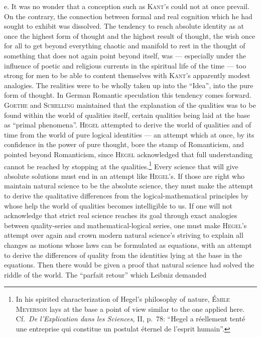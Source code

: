 \documentclass[12pt]{book}
\newcommand{\opage}[1]{\marginnote{\footnotesize\textit{[#1]}}}
\begin{document}
e. It was no wonder that a conception such as \textsc{Kant}'s could not at once
prevail. On the contrary, the connection between formal and real cognition which
he had sought to exhibit was dissolved. The tendency to reach absolute identity
as at once the highest form of thought and the highest result of thought, the
wish once for all to get beyond everything chaotic and manifold to rest in the
thought of something that does not again point beyond itself, was --- especially
under the influence of poetic and religious currents in the spiritual life of the
time --- too strong for men to be able to content themselves with \textsc{Kant}'s
apparently modest analogies. The realities were to be wholly taken up into the
``Idea'', into the pure form of thought. In German Romantic speculation this
tendency comes forward. \textsc{Goethe} and \textsc{Schelling} maintained that
the explanation of the qualities was to be found within the world of qualities
itself, certain qualities being laid at the base as ``primal phenomena''.
\textsc{Hegel} attempted to derive the world of qualities and of time from the
world of pure logical identities --- an attempt which at once, by its confidence
in the power of pure thought, bore the stamp of Romanticism, and pointed beyond
Romanticism, since \textsc{Hegel} acknowledged that \opage{95}full understanding cannot be
reached by stopping at the qualities.\footnote{In his spirited characterization
of Hegel's philosophy of nature, \textsc{Émile Meyerson} lays at the base a point
of view similar to the one applied here. Cf.\ \textit{De l'Explication dans les
Sciences,} II, p.\ 78: ``Hegel a réellement tenté une entreprise qui constitue un
postulat éternel de l'esprit humain''.} Every science that will give absolute
solutions must end in an attempt like \textsc{Hegel}'s. If those are right who
maintain natural science to be the absolute science, they must make the attempt
to derive the qualitative differences from the logical-mathematical principles by
whose help the world of qualities becomes intelligible to us. If one will not
acknowledge that strict real science reaches its goal through exact analogies
between quality-series and mathematical-logical series, one must make
\textsc{Hegel}'s attempt over again and crown modern natural science's striving to
explain all changes as motions whose laws can be formulated as equations, with an
attempt to derive the differences of quality from the identities lying at the
base in the equations. Then there would be given a proof that natural science had
solved the riddle of the world. The ``parfait retour'' which Leibniz demanded
\end{document}
